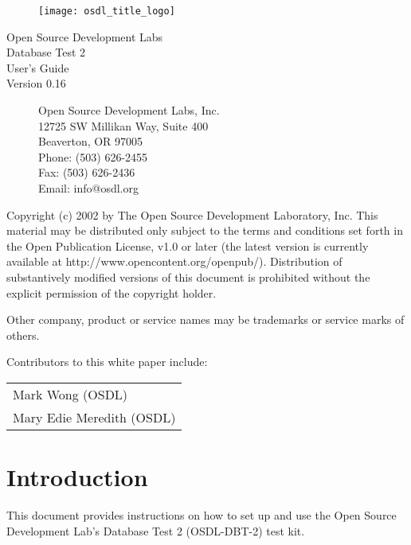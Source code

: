 \documentclass{article}
\begin{document}
\begin{titlepage}

\begin{figure}[t]
\centering
\texttt{[image: osdl\_title\_logo]}
\end{figure}

\centering
\huge
Open Source Development Labs \\
Database Test 2 \\
\Huge
User's Guide \\
\LARGE
Version 0.16

\begin{figure}[b]
\flushleft
\normalsize
Open Source Development Labs, Inc. \\
12725 SW Millikan Way, Suite 400 \\
Beaverton, OR 97005 \\
Phone: (503) 626-2455 \\
Fax: (503) 626-2436 \\
Email: info@osdl.org
\end{figure}

\end{titlepage}

Copyright (c) 2002 by The Open Source Development Laboratory, Inc. This
material may be distributed only subject to the terms and conditions set forth
in the Open Publication License, v1.0 or later (the latest version is currently
available at http://www.opencontent.org/openpub/). Distribution of
substantively modified versions of this document is prohibited without the
explicit permission of the copyright holder.

Other company, product or service names may be trademarks or service marks of
others.

Contributors to this white paper include: \\
\begin{tabular}[c]{l}
Mark Wong (OSDL) \\
Mary Edie Meredith (OSDL) \\
\end{tabular}

\pagebreak

\section{Introduction}

This document provides instructions on how to set up and use the Open Source
Development Lab's Database Test 2 (OSDL-DBT-2) test kit.
\end{document}
